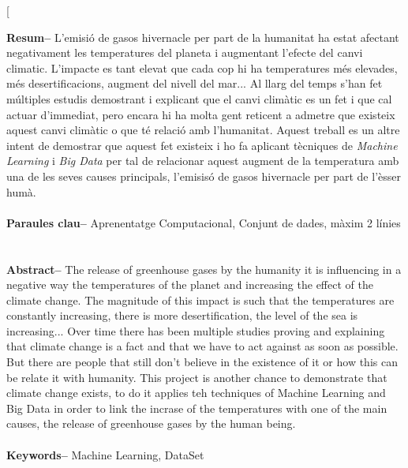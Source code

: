 \documentclass[10pt,a4paper,twocolumn,twoside]{article}
\begin{document}
\twocolumn[\begin{@twocolumnfalse}


\maketitle

\thispagestyle{primerapagina}
\begin{center}
\parbox{0.915\textwidth}
{\sffamily
\textbf{Resum--}
L'emisió de gasos hivernacle per part de la humanitat ha estat afectant negativament les temperatures del planeta i augmentant l'efecte del canvi climatic. L'impacte es tant elevat que cada cop hi ha temperatures més elevades, més desertificacions, augment del nivell del mar... Al llarg del temps s'han fet múltiples estudis demostrant i explicant que el canvi climàtic es un fet i que cal actuar d'immediat, pero encara hi ha molta gent reticent a admetre que existeix aquest canvi climàtic o que té relació amb l'humanitat. Aquest treball es un altre intent de demostrar que aquest fet existeix i ho fa aplicant tècniques de \textit{Machine Learning} i \textit{Big Data} per tal de relacionar aquest augment de la temperatura amb una de les seves causes principals, l'emisisó de gasos hivernacle per part de l'èsser humà.
\\
\\
\textbf{Paraules clau-- } Aprenentatge Computacional, Conjunt de dades, màxim 2 línies \\
\\
\bigskip
\\
\textbf{Abstract--} The release of greenhouse gases by the humanity it is influencing in a negative way the temperatures of the planet and increasing the effect of the climate change. The magnitude of this impact is such that the temperatures are constantly increasing, there is more desertification, the level of the sea is increasing... Over time there has been multiple studies proving and explaining that climate change is a fact and that we have to act against as soon as possible. But there are people that still don't believe in the existence of it or how this can be relate it with humanity. This project is another chance to demonstrate that climate change exists, to do it applies teh techniques of Machine Learning and Big Data in order to link the incrase of the temperatures with one of the main causes, the release of greenhouse gases by the human being.
\\
\\
\textbf{Keywords-- } Machine Learning, DataSet \\
}


\end{center}
\end{@twocolumnfalse}
\end{document}
